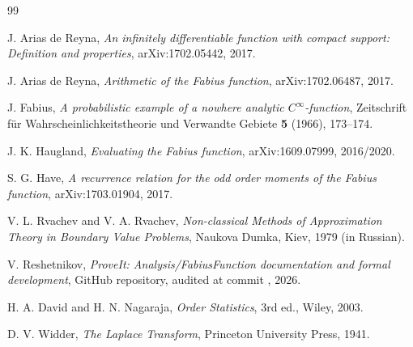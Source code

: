 \documentclass[11pt,oneside]{article}
\theoremstyle{definition}
\theoremstyle{remark}
\newcommand{\1}{\mathbf 1}
\begin{document}
\begin{thebibliography}{99}

J. Arias de Reyna,
\emph{An infinitely differentiable function with compact support: Definition
and properties}, arXiv:1702.05442, 2017.

J. Arias de Reyna,
\emph{Arithmetic of the Fabius function}, arXiv:1702.06487, 2017.

J. Fabius,
\emph{A probabilistic example of a nowhere analytic \(C^\infty\)-function},
Zeitschrift f\"ur Wahrscheinlichkeitstheorie und Verwandte Gebiete
\textbf{5} (1966), 173--174.

J. K. Haugland,
\emph{Evaluating the Fabius function}, arXiv:1609.07999, 2016/2020.

S. G. Have,
\emph{A recurrence relation for the odd order moments of the Fabius function},
arXiv:1703.01904, 2017.

V. L. Rvachev and V. A. Rvachev,
\emph{Non-classical Methods of Approximation Theory in Boundary Value Problems},
Naukova Dumka, Kiev, 1979 (in Russian).

V. Reshetnikov,
\emph{ProveIt: Analysis/FabiusFunction documentation and formal development},
GitHub repository, audited at commit
, 2026.

H. A. David and H. N. Nagaraja,
\emph{Order Statistics}, 3rd ed., Wiley, 2003.

D. V. Widder,
\emph{The Laplace Transform}, Princeton University Press, 1941.

\end{thebibliography}
\end{document}
